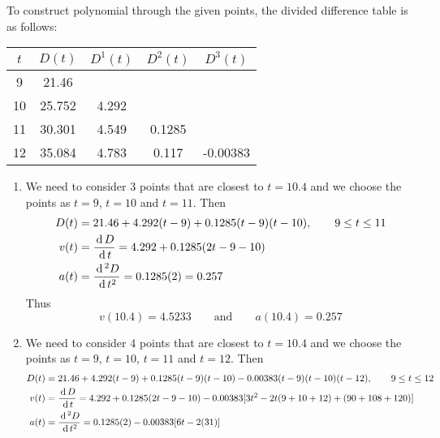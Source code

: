 \documentclass[12pt,class=book,crop=false]{standalone}
\begin{document}
\begin{soln}
    To construct  polynomial through the given points, the divided difference table is as follows:
    \begin{table}[H]
        \centering
        \begin{tabular}{c*{4}{S[table-format=2.5]}}
            \toprule
             &  &  &  &  \\     & 21.46    &            &            &            \\
            10    & 25.752   & 4.292      &            &            \\
            11    & 30.301   & 4.549      & 0.1285     &            \\
            12    & 35.084   & 4.783      & 0.117      & -0.00383   \\\bottomrule
        \end{tabular}
    \end{table}
    \begin{enumerate}[label=(\alph*)]
        \item We need to consider 3 points that are closest to $ t=10.4 $ and we choose the points as $ t=9 $, $  t=10 $ and $ t=11 $. Then
              \begin{align*}
                  D(t) & =21.46+4.292(t-9)+0.1285(t-9)(t-10),\qquad 9\leq t\leq 11 \\
                  v(t) & =\frac{\,\mathrm{d}\, D}{\,\mathrm{d}\, t}=4.292+0.1285(2t-9-10)                  \\
                  a(t) & =\frac{\,\mathrm{d}\,^2 D}{\,\mathrm{d}\, t^2}=0.1285(2)=0.257
              \end{align*}
              Thus
              \[
                  v(10.4)=4.5233 \qquad \text{and}\qquad a(10.4)=0.257
              \]
        \item We need to consider 4 points that are closest to $ t=10.4 $ and we choose the points as $ t=9 $,  $ t=10 $, $ t=11 $ and $ t=12 $. Then
              \begin{align*}
                  D(t) & =21.46+4.292(t-9)+0.1285(t-9)(t-10)-0.00383(t-9)(t-10)(t-12),\qquad 9\leq t\leq 12 \\
                  v(t) & =\frac{\D D}{\D t}=4.292+0.1285(2t-9-10)-0.00383[3t^2-2t(9+10+12)+(90+108+120)]    \\
                  a(t) & =\frac{\D^2 D}{\D t^2}=0.1285(2)-0.00383[6t-2(31)]

\end{align*}
\end{enumerate}
\end{soln}
\end{document}
